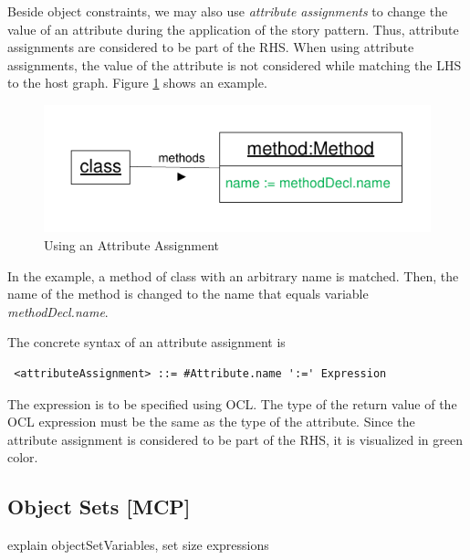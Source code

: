 Beside object constraints, we may also use \emph{attribute assignments} to change the value of an attribute during the application of the story pattern. Thus, attribute assignments are considered to be part of the RHS. When using attribute assignments, the value of the attribute is not considered while matching the LHS to the host graph. Figure \ref{fig:attributeAssignment} shows an example.

\begin{figure}[htbp]
  \centering
  \includegraphics[scale=1]{figures/AttributeAssignment}
  \caption{Using an Attribute Assignment}
  \label{fig:attributeAssignment}
\end{figure}

In the example, a method of class  with an arbitrary name is matched. Then, the name of the method is changed to the name that equals variable \emph{methodDecl.name}. 

The concrete syntax of an attribute assignment is
\begin{lstlisting}
 <attributeAssignment> ::= #Attribute.name ':=' Expression
\end{lstlisting}
The expression is to be specified using OCL. The type of the return value of the OCL expression must be the same as the type of the attribute. Since the attribute assignment is considered to be part of the RHS, it is visualized in green color.


\subsection{Object Sets [MCP]}

explain objectSetVariables, set size expressions



